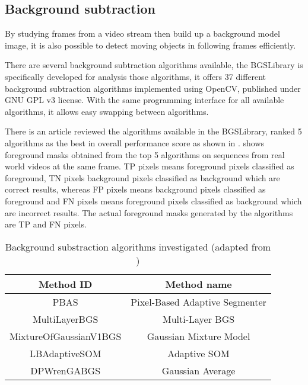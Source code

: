 \subsection{Background subtraction}
\label{motion_bs}

By studying frames from a video stream then build up a background model image, it is also possible to detect moving objects in following frames efficiently.





There are several background subtraction algorithms available, the BGSLibrary \cite{bgslibrary} is specifically developed for analysis those algorithms, it offers 37 different background subtraction algorithms implemented using OpenCV, published under GNU GPL v3 license. With the same programming interface for all available algorithms, it allows easy swapping between algorithms.

There is an article \cite{bgs:article} reviewed the algorithms available in the BGSLibrary, ranked 5 algorithms as the best in overall performance score as shown in .  shows foreground masks obtained from the top 5 algorithms on sequences from real world videos at the same frame. TP pixels means foreground pixels classified as foreground, TN pixels background pixels classified as background which are correct results, whereas FP pixels means background pixels classified as foreground and FN pixels means foreground pixels classified as background which are incorrect results. The actual foreground masks generated by the algorithms are TP and FN pixels.

\begin{table}[H]
  \centering
  \begin{tabular}{cc}
  \toprule
  \textbf{Method ID} & \textbf{Method name}\\
  \midrule
  PBAS & Pixel-Based Adaptive Segmenter \\
  MultiLayerBGS & Multi-Layer BGS \\
  MixtureOfGaussianV1BGS & Gaussian Mixture Model \\
  LBAdaptiveSOM & Adaptive SOM \\
  DPWrenGABGS & Gaussian Average \\
  \bottomrule
  \end{tabular}
  \caption{Background substraction algorithms investigated (adapted from \cite{bgslibrary})}
  \label{Table:bgs}
\end{table}


